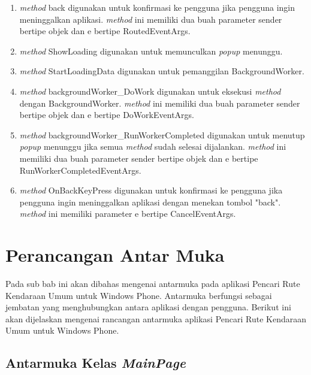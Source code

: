 \begin{enumerate}
	\item \textit{method} back digunakan untuk konfirmasi ke pengguna jika pengguna ingin meninggalkan aplikasi. \textit{method} ini memiliki dua buah parameter sender bertipe objek dan e bertipe RoutedEventArgs.
	\item \textit{method} ShowLoading digunakan untuk memunculkan \textit{popup} menunggu.
	\item \textit{method} StartLoadingData digunakan untuk pemanggilan BackgroundWorker.
	\item \textit{method} backgroundWorker\_DoWork digunakan untuk eksekusi \textit{method} dengan BackgroundWorker. \textit{method} ini memiliki dua buah parameter sender bertipe objek dan e bertipe DoWorkEventArgs.
	\item \textit{method} backgroundWorker\_RunWorkerCompleted digunakan untuk menutup \textit{popup} menunggu jika semua \textit{method} sudah selesai dijalankan. \textit{method} ini memiliki dua buah parameter sender bertipe objek dan e bertipe RunWorkerCompletedEventArgs.
	\item \textit{method} OnBackKeyPress digunakan untuk konfirmasi ke pengguna jika pengguna ingin meninggalkan aplikasi dengan menekan tombol "back". \textit{method} ini memiliki parameter e bertipe CancelEventArgs.
\end{enumerate}

\section{Perancangan Antar Muka}
\label{lab:Perancangan Kelas}
\hspace{0.5cm} Pada sub bab ini akan dibahas mengenai antarmuka pada aplikasi Pencari Rute Kendaraan Umum untuk Windows Phone. Antarmuka berfungsi sebagai jembatan yang menghubungkan antara aplikasi dengan pengguna. Berikut ini akan dijelaskan mengenai rancangan antarmuka aplikasi Pencari Rute Kendaraan Umum untuk Windows Phone. 

\subsection{Antarmuka Kelas \textit{MainPage}}
\label{lab:Antarmuka Kelas MainPage}

